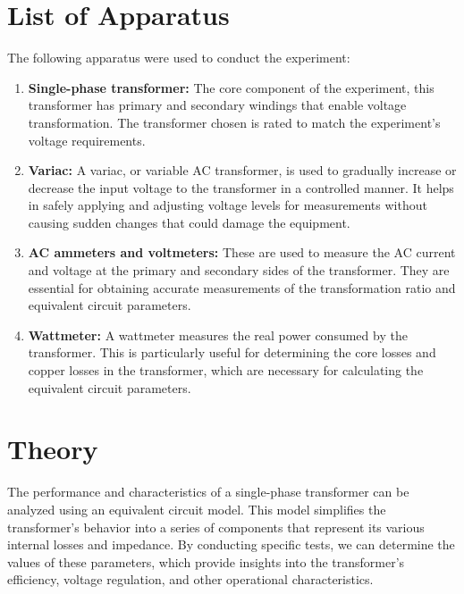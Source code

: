 \documentclass[12pt,a4paper]{report}
\begin{document}
\section{List of Apparatus}
The following apparatus were used to conduct the experiment:
\begin{enumerate}[label=\roman*.]
    \item \textbf{Single-phase transformer:} The core component of the experiment, this transformer has primary and secondary windings that enable voltage transformation. The transformer chosen is rated to match the experiment's voltage requirements.
    
    \item \textbf{Variac:} A variac, or variable AC transformer, is used to gradually increase or decrease the input voltage to the transformer in a controlled manner. It helps in safely applying and adjusting voltage levels for measurements without causing sudden changes that could damage the equipment.
    
    \item \textbf{AC ammeters and voltmeters:} These are used to measure the AC current and voltage at the primary and secondary sides of the transformer. They are essential for obtaining accurate measurements of the transformation ratio and equivalent circuit parameters.
    
    \item \textbf{Wattmeter:} A wattmeter measures the real power consumed by the transformer. This is particularly useful for determining the core losses and copper losses in the transformer, which are necessary for calculating the equivalent circuit parameters.
\end{enumerate}

\section{Theory}
The performance and characteristics of a single-phase transformer can be analyzed using an equivalent circuit model. This model simplifies the transformer’s behavior into a series of components that represent its various internal losses and impedance. By conducting specific tests, we can determine the values of these parameters, which provide insights into the transformer’s efficiency, voltage regulation, and other operational characteristics.
\end{document}
